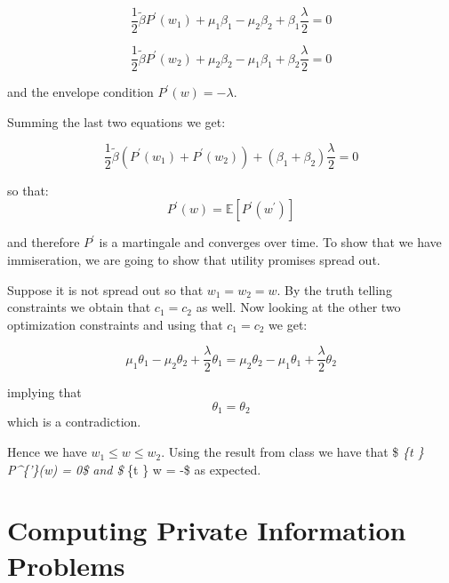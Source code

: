 \documentclass[11pt]{article}
\begin{document}
\[
\frac{1}{2} \tilde{\beta}P^{'}(w_1) + \mu_1 \beta_1 - \mu_2 \beta_2 + \beta_1 \frac{\lambda}{2}  = 0
\]

\[
\frac{1}{2} \tilde{\beta}P^{'}(w_2) + \mu_2 \beta_2 - \mu_1 \beta_1 + \beta_2 \frac{\lambda}{2}  = 0
\]

and the envelope condition \(P^{'}(w) = -\lambda\).

Summing the last two equations we get:

\[
\frac{1}{2} \tilde{\beta}(P^{'}(w_1) + P^{'}(w_2)) + (\beta_1 + \beta_2) \frac{\lambda}{2}  = 0
\]

so that: \[
P^{'}(w) = \mathbb{E}\left[P^{'}(w^{'})\right]
\]

and therefore \(P^{'}\) is a martingale and converges over time. To show
that we have immiseration, we are going to show that utility promises
spread out.

    Suppose it is not spread out so that \(w_1 = w_2 = w\). By the truth
telling constraints we obtain that \(c_1 = c_2\) as well. Now looking at
the other two optimization constraints and using that \(c_1 = c_2\) we
get:

\[
\mu_1 \theta_1 - \mu_2 \theta_2 + \frac{\lambda}{2} \theta_1 = \mu_2 \theta_2 - \mu_1 \theta_1 + \frac{\lambda}{2} \theta_2
\]

implying that \[
\theta_1 = \theta_2
\] which is a contradiction.

Hence we have \(w_1 \leq w \leq w_2\). Using the result from class we
have that \$ \lim\emph{\{t \to \infty\} P\^{}\{'\}(w) = 0\$ and \$
\lim}\{t \to \infty\} w = -\infty\$ as expected.

    \hypertarget{computing-private-information-problems}{%
\section{Computing Private Information
Problems}\label{computing-private-information-problems}}
\end{document}

